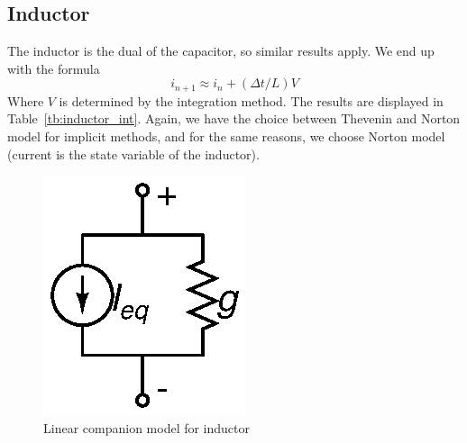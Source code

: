 \documentclass{article}
\begin{document}
\pagebreak

\subsection{Inductor}
The inductor is the dual of the capacitor, so similar results apply. We end up with the formula
\begin{equation}
i_{n+1} \approx i_n + (\Delta t/L)V
\end{equation}
Where $V$ is determined by the integration method. The results are displayed in Table~\ref{tb:inductor_int}. Again, we have the choice between Thevenin and Norton model for implicit methods, and for the same reasons, we choose Norton model (current is the state variable of the inductor).

\begin{table}[h]
\caption{Induction companion model parameters for integration methods \label{tb:inductor_int}}
\centering
{}
\end{table}

\begin{figure}[h]
\begin{center}
\includegraphics{fig/inductor.eps}
\caption{Linear companion model for inductor \label{fig:inductor}}
\end{center}
\end{figure}

\pagebreak

\nocite{*}

\end{document}
